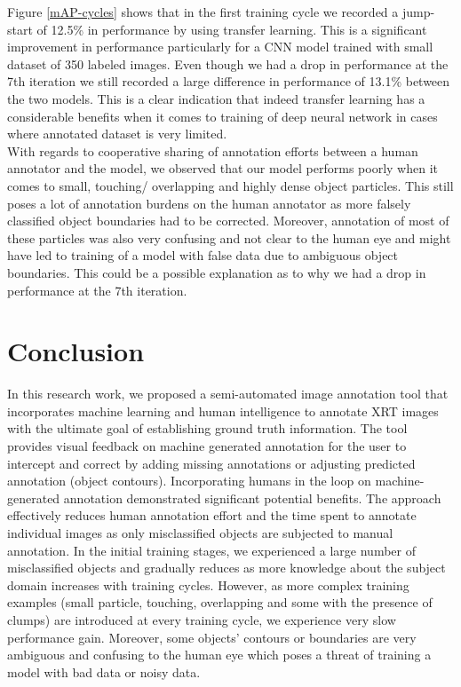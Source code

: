 \documentclass[conference]{IEEEtran}
\begin{document}
	Figure \ref{mAP-cycles} shows that in the first training cycle we recorded a jump-start of 12.5\% in performance by using transfer learning. This is a significant improvement in performance particularly for a CNN model trained with small dataset of 350 labeled images. Even though we had a drop in performance at the 7th iteration we still recorded a large difference in
performance of 13.1\% between the two models. This is a clear indication that indeed transfer
learning has a considerable benefits when it comes to training of deep neural network in
cases where annotated dataset is very limited.\\
		
	With regards to cooperative sharing of annotation efforts between a human annotator and the model, we observed that our model performs poorly when it comes to small, touching/ overlapping and highly dense object particles. This still poses a lot of annotation
burdens on the human annotator as more falsely classified object boundaries had to be
corrected. Moreover, annotation of most of these particles was also very confusing and not
clear to the human eye and might have led to training of a model with false data due to
ambiguous object boundaries. This could be a possible explanation as to why we had a
drop in performance at the 7th iteration.

		
\section{Conclusion}
	
	In this research work, we proposed a semi-automated image annotation tool that incorporates machine learning and human intelligence to annotate XRT images with the ultimate
goal of establishing ground truth information. The tool provides visual feedback on machine generated annotation for the user to intercept and correct by adding missing annotations or
adjusting predicted annotation (object contours). Incorporating humans in the loop on
machine-generated annotation demonstrated significant potential benefits. The approach
effectively reduces human annotation effort and the time spent to annotate individual
images as only misclassified objects are subjected to manual annotation. In the initial
training stages, we experienced a large number of misclassified objects and gradually reduces
as more knowledge about the subject domain increases with training cycles. However,
as more complex training examples (small particle, touching, overlapping and some with
the presence of clumps) are introduced at every training cycle, we experience very slow
performance gain. Moreover, some objects’ contours or boundaries are very ambiguous
and confusing to the human eye which poses a threat of training a model with bad data or
noisy data.\\
	
\end{document}
